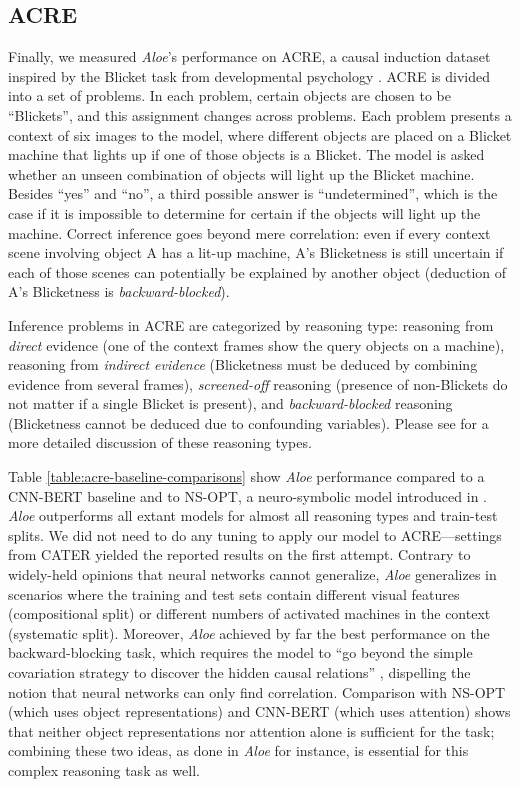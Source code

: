 \documentclass{article}
\newcommand{\Model}{\emph{Aloe}}
\begin{document}
\subsection{ACRE}

Finally, we measured \Model{}'s performance on ACRE, a causal induction dataset inspired by the Blicket task from developmental psychology
\citep{acre, blicket}. 
ACRE is divided into a set of problems. In each problem, certain  objects are chosen to be ``Blickets'',
and this assignment changes across problems.
Each problem presents a context of six images to the model,
where different objects are placed on a Blicket machine that lights up if one of those objects is a Blicket.
The model is asked whether an unseen combination of objects will light up the Blicket machine.
Besides ``yes'' and ``no'', a third possible answer is ``undetermined'',
which is the case if it is impossible to determine for certain if the objects will light up the machine.
Correct inference goes beyond mere correlation:
even if 
every context scene involving object A has a lit-up machine,
A's Blicketness is still uncertain if each of those scenes can potentially be explained by another object (deduction of A's Blicketness is \emph{backward-blocked}).

Inference problems in ACRE are categorized by reasoning type: reasoning from \emph{direct} evidence (one of the context frames show the query objects on a machine), reasoning from \emph{indirect evidence} (Blicketness must be deduced by combining evidence from several frames), \emph{screened-off} reasoning (presence of non-Blickets do not matter if a single Blicket is present), and \emph{backward-blocked} reasoning (Blicketness cannot be deduced due to confounding variables). Please see \citet{acre} for a more detailed discussion of these reasoning types.


Table \ref{table:acre-baseline-comparisons} show \Model{} performance compared to a CNN-BERT baseline and to NS-OPT, a neuro-symbolic model
introduced in \citet{acre}.
\Model{} outperforms all extant models for almost all reasoning types and train-test splits.
We did not need to do any tuning to apply our model to ACRE---settings from CATER yielded the reported results on the first attempt. 
Contrary to widely-held opinions that neural networks cannot generalize,
\Model{} generalizes in scenarios where the training and test sets contain different visual features (compositional split)
or different numbers of activated  machines in the context (systematic split).
Moreover, \Model{} achieved by far the best performance on the backward-blocking task,
which requires the model to ``go beyond the simple
covariation strategy to discover the hidden causal relations'' \citep{acre},
dispelling the notion that neural networks can only find correlation.
Comparison with NS-OPT (which uses object representations) and CNN-BERT (which uses attention)
shows that neither object representations nor attention alone is sufficient for the task;
combining these two ideas, as done in \Model{} for instance, is essential for this
complex reasoning task as well.
\end{document}
